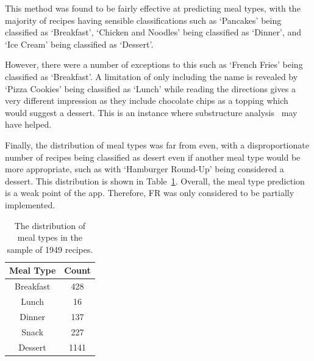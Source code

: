 This method was found to be fairly effective at predicting meal types, with the majority of recipes having sensible
classifications such as \enquote*{Pancakes} being classified as \enquote*{Breakfast}, \enquote*{Chicken and Noodles} being
classified as \enquote*{Dinner}, and \enquote*{Ice Cream} being classified as \enquote*{Dessert}.

However, there were a number of exceptions to this such as \enquote*{French Fries} being classified as \enquote*{Breakfast}.
A limitation of only including the name is revealed by \enquote*{Pizza Cookies} being classified as \enquote*{Lunch}
while reading the directions gives a very different impression as they include chocolate chips as a topping which would
suggest a dessert. This is an instance where substructure analysis~\cite{wang_substructure_2008} may have helped.

Finally, the distribution of meal types was far from even, with a disproportionate number of recipes being classified as
desert even if another meal type would be more appropriate, such as with \enquote*{Hamburger Round-Up} being considered
a dessert. This distribution is shown in Table~\ref{tab:meal_type_distribution}. Overall, the meal type prediction
is a weak point of the app. Therefore, FR was only considered to be partially implemented.

\begin{table}[h!]
  \centering
  \caption{\label{tab:meal_type_distribution}The distribution of meal types in the sample of 1949 recipes.}
  \begin{tabular}{cc}\toprule
    \textbf{Meal Type} & \textbf{Count} \\\midrule
    Breakfast&428\\
    Lunch&16\\
    Dinner&137\\
    Snack&227\\
    Dessert&1141\\
  \end{tabular}
\end{table}
